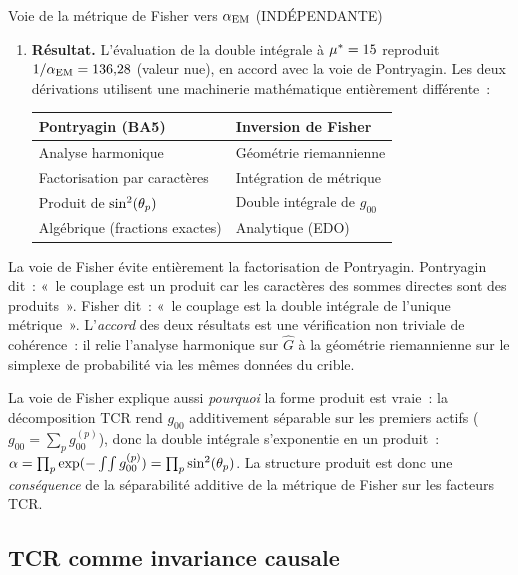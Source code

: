 \documentclass[12pt,a4paper]{article}
\begin{document}
\begin{derbox}{Voie de la métrique de Fisher vers $\alpha_{\mathrm{EM}}$ (INDÉPENDANTE)}
\begin{enumerate}[leftmargin=*, label=\textbf{(\roman*)}]
\item \textbf{Résultat.}
  L'évaluation de la double intégrale à ${\mu^{*}} = 15$ reproduit
  $1/\alpha_{\mathrm{EM}} = 136{,}28$ (valeur nue), en accord avec la voie de
  Pontryagin. Les deux dérivations utilisent une machinerie
  mathématique entièrement différente~:
  \begin{center}
  \begin{tabular}{ll}
  \toprule
  \textbf{Pontryagin (BA5)} & \textbf{Inversion de Fisher} \\
  \midrule
  Analyse harmonique & Géométrie riemannienne \\
  Factorisation par caractères & Intégration de métrique \\
  Produit de $\sin^2(\theta_{p})$ & Double intégrale de $g_{00}$ \\
  Algébrique (fractions exactes) & Analytique (EDO) \\
  \bottomrule
  \end{tabular}
  \end{center}
\end{enumerate}
\end{derbox}

\begin{remarque}\mBR
\label{rem:fisher_independence}
La voie de Fisher évite entièrement la factorisation de Pontryagin.
Pontryagin dit~: «~le couplage est un produit car les caractères
des sommes directes sont des produits~». Fisher dit~: «~le
couplage est la double intégrale de l'unique métrique~». L'\emph{accord}
des deux résultats est une vérification non triviale de
cohérence~: il relie l'analyse harmonique sur $\widehat{G}$ à la
géométrie riemannienne sur le simplexe de probabilité via les
mêmes données du crible.

La voie de Fisher explique aussi \emph{pourquoi} la forme produit
est vraie~: la décomposition TCR rend $g_{00}$ additivement
séparable sur les premiers actifs
($g_{00} = \sum_p g_{00}^{(p)}$), donc la double intégrale
s'exponentie en un produit~:
$\alpha = \prod_p \exp(-\int\!\int g_{00}^{(p)}) = \prod_p \sin^2(\theta_{p})$.
La structure produit est donc une \emph{conséquence} de la
séparabilité additive de la métrique de Fisher sur les facteurs
TCR.
\end{remarque}

\subsection{TCR comme invariance causale}
\label{sec:ch9_causal}
\end{document}
